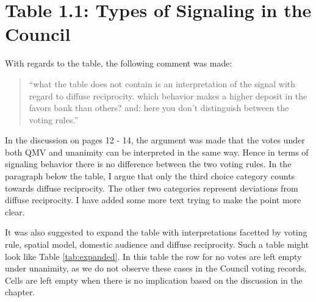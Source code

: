\documentclass{article}
\begin{document}
\section{Table 1.1: Types of Signaling in the Council}

With regards to the table, the following comment was made:

\begin{quote}
  ``what the table does not contain is an interpretation of the signal with regard to diffuse reciprocity. which behavior makes a higher deposit in the favors bank than others? and: here you don't distinguish between the voting rules.''
\end{quote}

In the discussion on pages 12 - 14, the argument was made that the votes under both QMV and unanimity can be interpreted in the same way. Hence in terms of signaling behavior there is no difference between the two voting rules. In the paragraph below the table, I argue that only the third choice category counts towards diffuse reciprocity. The other two categories represent deviations from diffuse reciprocity. I have added some more text trying to make the point more clear. 

It was also suggested to expand the table with interpretations facetted by voting rule, spatial model, domestic audience and diffuse reciprocity. Such a table might look like Table \ref{tab:expanded}. In this table the row for no votes are left empty under unanimity, as we do not observe these cases in the Council voting records. Cells are left empty when there is no implication based on the discussion in the chapter. 

\begin{table}[htp]
\setlength{\extrarowheight}{10pt}
  \centering
  \caption{To be determined}
  \label{tab:expanded}
\end{table}
\end{document}
